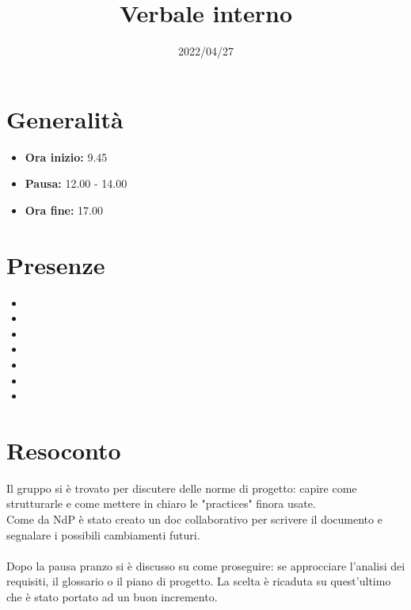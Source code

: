 \documentclass{classes/base}
\title{Verbale interno}
\date{2022/04/27}
\author{\marcob}
\renewcommand{\maketitle}{
    
}
\begin{document}
    \maketitle

    \section*{Generalità}
    \begin{itemize}
        \item \textbf{Ora inizio:} 9.45
        \item  \textbf{Pausa: } 12.00 - 14.00
        \item \textbf{Ora fine:} 17.00
    \end{itemize}

    \section*{Presenze}
    \begin{itemize}
        \item \tommaso
        \item \marcob
        \item \marcov
        \item \angela
        \item \giulio
        \item \ruth
        \item \matteo
    \end{itemize}

    \section*{Resoconto}
    Il gruppo si è trovato per discutere delle norme di progetto: capire come strutturarle e come mettere in chiaro le "practices" finora usate.\\
    Come da NdP è stato creato un doc collaborativo per scrivere il documento e segnalare i possibili cambiamenti futuri.\\\\
    Dopo la pausa pranzo si è discusso su come proseguire: se approcciare l'analisi dei requisiti, il glossario o il piano di progetto. La scelta è ricaduta su quest'ultimo che è stato portato ad un buon incremento. 
\end{document}
